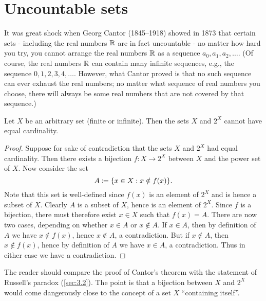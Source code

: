 \section{Uncountable sets}\label{sec:8.3}

\begin{note}
  It was great shock when Georg Cantor (1845--1918) showed in 1873 that certain sets
  - including the real numbers \(\mathbb{R}\) are in fact uncountable -
  no matter how hard you try, you cannot arrange the real numbers \(\mathbb{R}\) as a sequence \(a_0, a_1, a_2, \dots\).
  (Of course, the real numbers \(\mathbb{R}\) can contain many infinite sequences, e.g., the sequence \(0, 1, 2, 3, 4, \dots\).
  However, what Cantor proved is that no such sequence can ever exhaust the real numbers;
  no matter what sequence of real numbers you choose, there will always be some real numbers that are not covered by that sequence.)
\end{note}

\begin{thm}\label{8.3.1}
  Let \(X\) be an arbitrary set (finite or infinite).
  Then the sets \(X\) and \(2^X\) cannot have equal cardinality.
\end{thm}

\begin{proof}
  Suppose for sake of contradiction that the sets \(X\) and \(2^X\) had equal cardinality.
  Then there exists a bijection \(f : X \to 2^X\) between \(X\) and the power set of \(X\).
  Now consider the set
  \[
    A \coloneqq \set{x \in X : x \notin f(x)}.
  \]
  Note that this set is well-defined since \(f(x)\) is an element of \(2^X\) and is hence a subset of \(X\).
  Clearly \(A\) is a subset of \(X\), hence is an element of \(2^X\).
  Since \(f\) is a bijection, there must therefore exist \(x \in X\) such that \(f(x) = A\).
  There are now two cases, depending on whether \(x \in A\) or \(x \notin A\).
  If \(x \in A\), then by definition of \(A\) we have \(x \notin f(x)\), hence \(x \notin A\), a contradiction.
  But if \(x \notin A\), then \(x \notin f(x)\), hence by definition of \(A\) we have \(x \in A\), a contradiction.
  Thus in either case we have a contradiction.
\end{proof}

\begin{rmk}\label{8.3.2}
  The reader should compare the proof of Cantor's theorem with the statement of Russell's paradox (\cref{sec:3.2}).
  The point is that a bijection between \(X\) and \(2^X\) would come dangerously close to the concept of a set \(X\) ``containing itself''.
\end{rmk}

